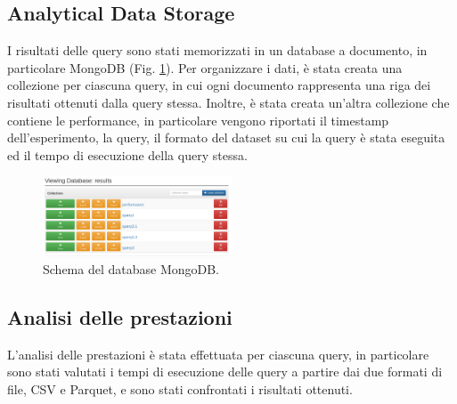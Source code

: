 \documentclass[conference]{IEEEtran}
\begin{document}
\subsection{Analytical Data Storage}
I risultati delle query sono stati memorizzati in un database a documento, in particolare MongoDB (Fig. \ref{fig:mongo}).
Per organizzare i dati, è stata creata una collezione per ciascuna query, in cui ogni documento rappresenta una riga dei risultati ottenuti dalla query stessa. Inoltre, è stata creata un'altra collezione che contiene le performance, in particolare vengono riportati il timestamp dell'esperimento, la query, il formato del dataset su cui la query è stata eseguita ed il tempo di esecuzione della query stessa.
\begin{figure}[H]
    \centerline{\includegraphics[width=0.5\textwidth]{res/mongo.png}}
    \caption{Schema del database MongoDB.}
    \label{fig:mongo}
\end{figure}
\subsection{Analisi delle prestazioni}
L'analisi delle prestazioni è stata effettuata per ciascuna query, in particolare sono stati valutati i tempi di esecuzione delle query a partire dai due formati di file, CSV e Parquet, e sono stati confrontati i risultati ottenuti.

\vspace{12pt}
\end{document}
